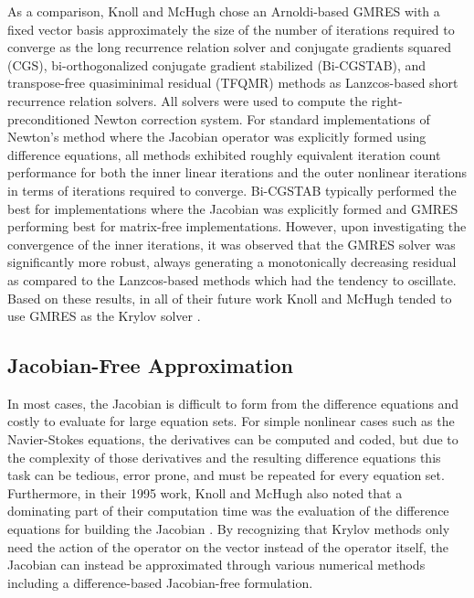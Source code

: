 As a comparison, Knoll and McHugh chose an Arnoldi-based GMRES with a
fixed vector basis approximately the size of the number of iterations
required to converge as the long recurrence relation solver and
conjugate gradients squared (CGS), bi-orthogonalized conjugate
gradient stabilized (Bi-CGSTAB), and transpose-free quasiminimal
residual (TFQMR) methods as Lanzcos-based short recurrence relation
solvers. All solvers were used to compute the right-preconditioned
Newton correction system. For standard implementations of Newton's
method where the Jacobian operator was explicitly formed using
difference equations, all methods exhibited roughly equivalent
iteration count performance for both the inner linear iterations and
the outer nonlinear iterations in terms of iterations required to
converge. Bi-CGSTAB typically performed the best for
implementations where the Jacobian was explicitly formed and GMRES
performing best for matrix-free implementations. However, upon
investigating the convergence of the inner iterations, it was observed
that the GMRES solver was significantly more robust, always generating
a monotonically decreasing residual as compared to the Lanzcos-based
methods which had the tendency to oscillate. Based on these results,
in all of their future work Knoll and McHugh tended to use GMRES as
the Krylov solver \citep{knoll_jacobian-free_2004}.

\subsection{Jacobian-Free Approximation}
\label{subsec:jacobian_free_approximation}
In most cases, the Jacobian is difficult to form from the difference
equations and costly to evaluate for large equation sets. For simple
nonlinear cases such as the Navier-Stokes equations, the derivatives
can be computed and coded, but due to the complexity of those
derivatives and the resulting difference equations this task can be
tedious, error prone, and must be repeated for every equation
set. Furthermore, in their 1995 work, Knoll and McHugh also noted that
a dominating part of their computation time was the evaluation of the
difference equations for building the Jacobian
\citep{knoll_newton-krylov_1995}. By recognizing that Krylov methods
only need the action of the operator on the vector instead of the
operator itself, the Jacobian can instead be approximated through
various numerical methods including a difference-based Jacobian-free
formulation. 

